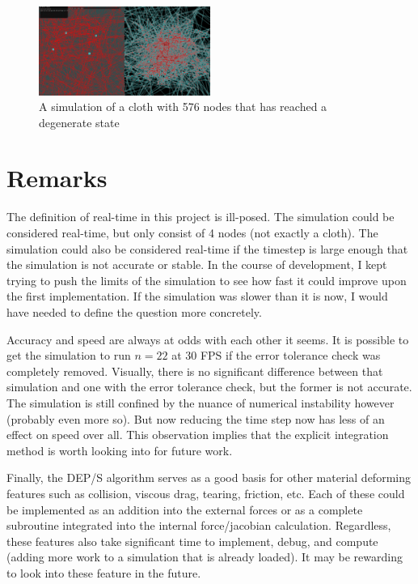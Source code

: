 \documentclass[letterpaper, 10 pt, conference]{ieeeconf}  %
\begin{document}
\begin{figure}
        \centering
        \includegraphics[width=0.5\textwidth]{chaos1.png}
        \caption{A simulation of a cloth with 576 nodes that has reached a degenerate state} \label{fig:chaos}
\end{figure}

\section{Remarks}
        The definition of real-time in this project is ill-posed. The simulation could be considered real-time, but only consist of 4 nodes (not exactly a cloth). The simulation could also be considered real-time if the timestep is large enough that the simulation is not accurate or stable. In the course of development, I kept trying to push the limits of the simulation to see how fast it could improve upon the first implementation. If the simulation was slower than it is now, I would have needed to define the question more concretely. 

        Accuracy and speed are always at odds with each other it seems. It is possible to get the simulation to run $n=22$ at 30 FPS if the error tolerance check was completely removed. Visually, there is no significant difference between that simulation and one with the error tolerance check, but the former is not accurate. The simulation is still confined by the nuance of numerical instability however (probably even more so). But now reducing the time step now has less of an effect on speed over all. This observation implies that the explicit integration method is worth looking into for future work.

        Finally, the DEP/S algorithm serves as a good basis for other material deforming features such as collision, viscous drag, tearing, friction, etc. Each of these could be implemented as an addition into the external forces or as a complete subroutine integrated into the internal force/jacobian calculation. Regardless, these features also take significant time to implement, debug, and compute (adding more work to a simulation that is already loaded). It may be rewarding to look into these feature in the future.
\end{document}
